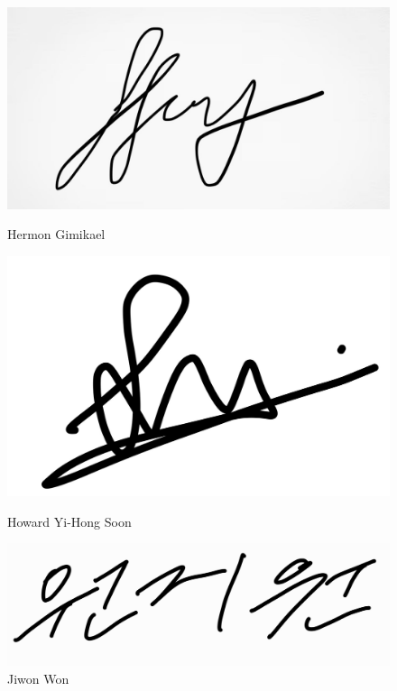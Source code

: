 \documentclass{article}
\begin{document}
\begin{figure}[htbp]
    \centering
    \begin{minipage}[b]{0.3\textwidth}
        \centering
        \includegraphics[width=\textwidth]{Jiwon/Hermon.jpeg}
        \caption{Hermon Gimikael}
    \end{minipage}
    \hfill
    \begin{minipage}[b]{0.3\textwidth}
        \centering
        \includegraphics[width=\textwidth]{Jiwon/Howard.jpeg}
        \caption{Howard Yi-Hong Soon}
    \end{minipage}
    \hfill
    \begin{minipage}[b]{0.3\textwidth}
        \centering
        \includegraphics[width=\textwidth]{Jiwon/Jiwon.jpg}
        \caption{Jiwon Won}
    \end{minipage}


\end{figure}
\end{document}

